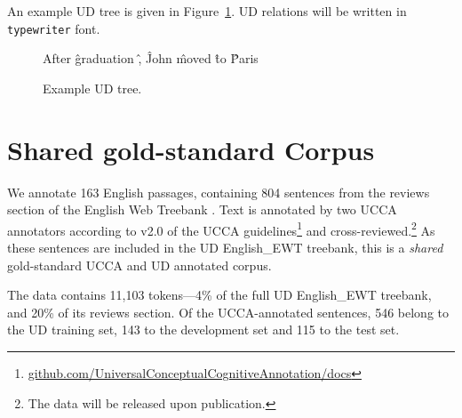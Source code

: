 \documentclass[11pt,a4paper]{article}
\newcommand{\daniel}[1]{\footnote{\color{blue}DH: #1}}
\begin{document}
An example UD tree is given in Figure~\ref{fig:original_example_ud}.
UD relations will be written in \texttt{typewriter} font.

\begin{figure}[th]
  \centering
    \begin{dependency}[text only label, label style={above,font=\tt}, font=\small]
    \begin{deptext}[column sep=.8em,ampersand replacement=\^]
    After \^ graduation \^ , \^ John \^ moved \^ to \^ Paris \\
    \end{deptext}
    \end{dependency}
\caption{Example UD tree.\label{fig:original_example_ud}}
\end{figure}

\section{Shared gold-standard Corpus}\label{sec:shared}

We annotate 163 English passages, containing 804 sentences
from the reviews section of the 
English Web Treebank \cite[EWT; ][]{bies2012english}.
Text is annotated by two UCCA annotators
according to v2.0 of the UCCA
guidelines\footnote{\tiny\url{github.com/UniversalConceptualCognitiveAnnotation/docs}}
and cross-reviewed.\footnote{The data will be released upon publication.}
As these sentences are included in the UD
English\_EWT treebank, this is a \textit{shared} gold-standard UCCA and UD
annotated corpus.

The data contains 11,103 tokens---4\% of the full UD English\_EWT treebank,
and 20\% of its reviews section.
Of the UCCA-annotated sentences, 546 belong to the UD training set,
143 to the development set and 115 to the test set.

\end{document}
